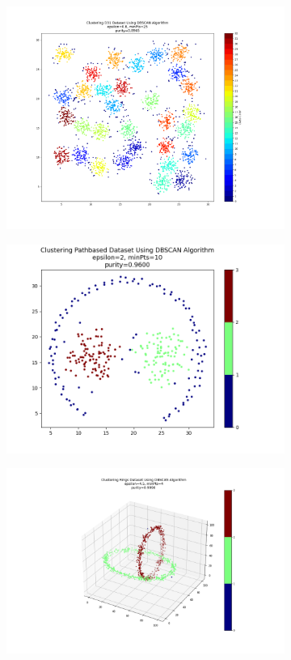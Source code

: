 \documentclass[12pt, a4paper]{article}
\begin{document}
\begin{figure}[h]
    \begin{subfigure}{0.45\linewidth}
        \centering
        \includegraphics[width=0.8\linewidth]{images/q2/d31.png}
        \caption{}
        \label{d31}
    \end{subfigure}
    \hfill
    \begin{subfigure}{0.45\linewidth}
        \centering
        \includegraphics[width=0.8\linewidth]{images/q2/pathbased.png}
        \caption{}
        \label{pathbased}
    \end{subfigure}
    \newline
    \begin{subfigure}{0.45\linewidth}
        \centering
        \includegraphics[width=\linewidth]{images/q2/rings.png}

\end{subfigure}
\end{figure}
\end{document}
